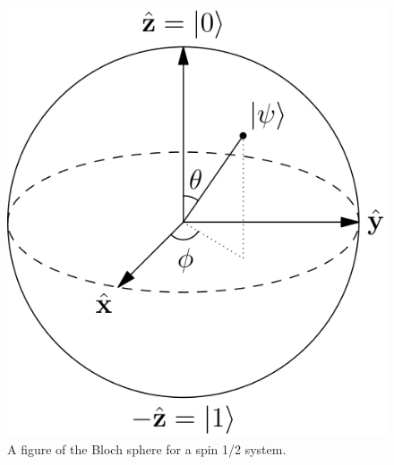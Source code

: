 \documentclass[•]{beamer}
\theoremstyle{remark}
\begin{document}
\begin{frame}

\begin{figure}[h]
\begin{center}
\includegraphics[scale=0.3]{Bloch_Sphere.png} 
\caption{A figure of the Bloch sphere for a spin 1/2 system.}
\end{center}
\end{figure}
\end{frame}
\end{document}
